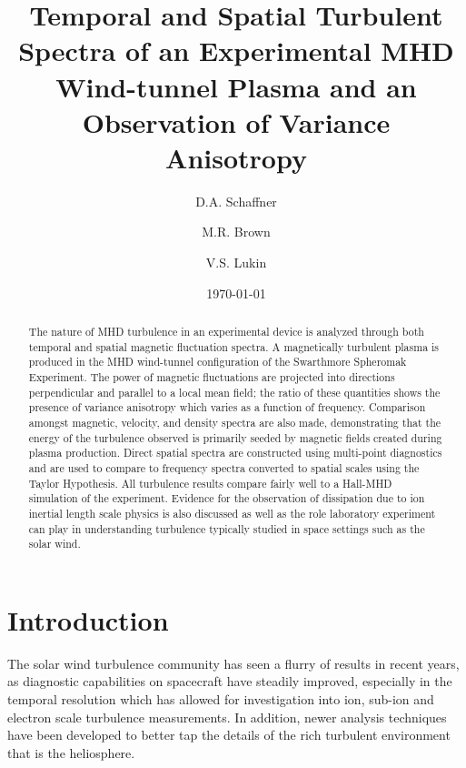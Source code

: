 \documentclass[aip,prl,amsmath,amssymb,reprint,superscriptaddress]{revtex4-1} %
\begin{document}
\title{Temporal and Spatial Turbulent Spectra of an Experimental MHD Wind-tunnel Plasma and an Observation of Variance Anisotropy}

\author{D.A. Schaffner}
\author{M.R. Brown}
\author{V.S. Lukin}

\date{\today}
\begin{abstract}
The nature of MHD turbulence in an experimental device is analyzed through both temporal and spatial magnetic fluctuation spectra. A magnetically turbulent plasma is produced in the MHD wind-tunnel configuration of the Swarthmore Spheromak Experiment. The power of magnetic fluctuations are projected into directions perpendicular and parallel to a local mean field; the ratio of these quantities shows the presence of variance anisotropy which varies as a function of frequency. Comparison amongst magnetic, velocity, and density spectra are also made, demonstrating that the energy of the turbulence observed is primarily seeded by magnetic fields created during plasma production. Direct spatial spectra are constructed using multi-point diagnostics and are used to compare to frequency spectra converted to spatial scales using the Taylor Hypothesis. All turbulence results compare fairly well to a Hall-MHD simulation of the experiment. Evidence for the observation of dissipation due to ion inertial length scale physics is also discussed as well as the role laboratory experiment can play in understanding turbulence typically studied in space settings such as the solar wind.
\end{abstract}

\maketitle

\section{Introduction}

The solar wind turbulence community has seen a flurry of results in recent years, as diagnostic capabilities on spacecraft have steadily improved, especially in the temporal resolution which has allowed for investigation into ion, sub-ion and electron scale turbulence measurements. In addition, newer analysis techniques have been developed to better tap the details of the rich turbulent environment that is the heliosphere. 
\end{document}
